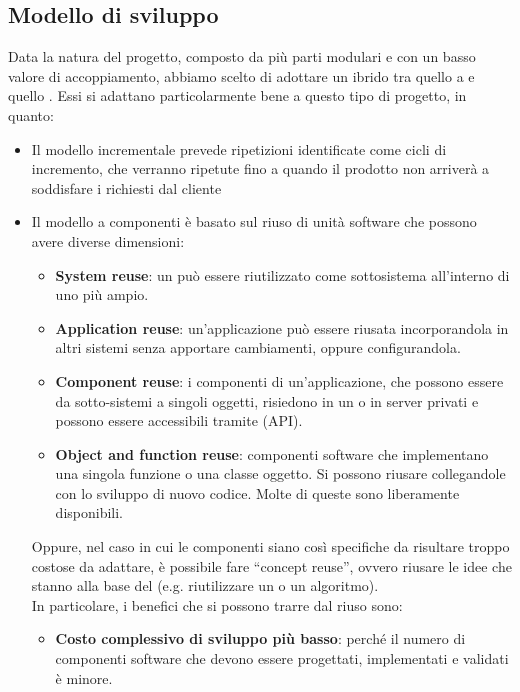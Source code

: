 	\subsection{Modello di sviluppo}\label{modello di sviluppo}
	Data la natura del progetto, composto da più parti modulari e con un basso valore di accoppiamento, abbiamo scelto di adottare un  ibrido tra quello a  e quello .
	Essi si adattano particolarmente bene a questo tipo di progetto, in quanto:
	\begin{itemize}
		\item Il modello incrementale prevede ripetizioni identificate come cicli di incremento,
		che verranno ripetute fino a quando il prodotto non arriverà a soddisfare i  richiesti dal cliente
		\item Il modello a componenti è basato sul riuso di unità software che possono avere diverse dimensioni:
		\begin{itemize}
			\item \textbf{System reuse}: un  può essere riutilizzato come sottosistema all'interno di uno più ampio.
			\item \textbf{Application reuse}: un'applicazione può essere riusata incorporandola in altri sistemi senza apportare cambiamenti,
				oppure configurandola.
			\item \textbf{Component reuse}: i componenti di un'applicazione, che possono essere da sotto-sistemi a singoli oggetti, risiedono
				in un  o in server privati e possono essere accessibili tramite  (API).
			\item \textbf{Object and function reuse}: componenti software che implementano una singola funzione o una classe oggetto. Si
				possono riusare collegandole con lo sviluppo di nuovo codice. Molte di queste sono liberamente disponibili.
		\end{itemize}
		Oppure, nel caso in cui le componenti siano così specifiche da risultare troppo costose da adattare,
		è possibile fare ``concept reuse'', ovvero riusare le idee che stanno alla base del  (e.g. riutilizzare un  o un algoritmo). \\
		In particolare, i benefici che si possono trarre dal riuso sono:
		\begin{itemize}
			\item \textbf{Costo complessivo di sviluppo più basso}: perché il numero di componenti software che devono essere progettati, implementati e validati è minore.

\end{itemize}
\end{itemize}
